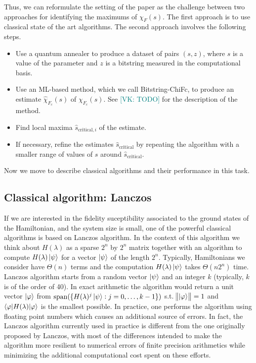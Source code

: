 \documentclass[american,aps,pra,reprint,floatfix,nofootinbib,superscriptaddress]{revtex4-2}
\DeclareMathOperator{\mspan}{span}
\newcommand{\VK}[1]{\textcolor{teal}{[VK: #1]}}
\begin{document}
Thus, we can reformulate the setting of the paper as the challenge
between two approaches for identifying the maximums of $\chi_F(s)$.
The first approach is to use classical state of the art algorithms.
The second approach involves the following steps.
\begin{itemize}
  \item Use a quantum annealer to produce a dataset of pairs $(s,z)$,
    where $s$ is a value of the parameter and $z$ is a bitstring
    measured in the computational basis.
  \item Use an ML-based method, which we call Bitstring-ChiFc,
    to produce an estimate
    $\widehat\chi_{F_c}(s)$ of $\chi_{F_c}(s)$.
    See \VK{TODO} for the description of the method.
  \item Find local maxima $\hat s_{\textrm{critical},i}$ of the estimate.
  \item If necessary, refine the estimates $\hat s_{\textrm{critical}}$
    by repeating the algorithm with a smaller range of values of $s$
    around $\hat s_{\textrm{critical}}$.
\end{itemize}

Now we move to describe classical algorithms and their performance in this
task.

\subsection{Classical algorithm: Lanczos}
If we are interested in the fidelity suceptibility associated
to the ground states of the Hamiltonian, and the system size is small,
one of the powerful classical algorithms is based on Lanczos algorithm.
In the context of this algorithm we think about $H(\lambda)$ as
a sparse $2^n$ by $2^n$ matrix together with an algorithm to compute
$H(\lambda)\ket{\psi}$ for a vector $\ket{\psi}$ of the length $2^n$.
Typically, Hamiltonians we consider have
$\Theta(n)$ terms and the computation $H(\lambda)\ket{\psi}$
takes $\Theta(n2^n)$ time. Lanczos algorithm starts from
a random vector $\ket{\psi}$ and an integer $k$ (typically,
$k$ is of the order of 40). In exact arithmetic the algorithm would
return a unit vector $\ket{\varphi}$ from
$\mspan(\{H(\lambda)^j\ket{\psi}: j=0,\dots,k-1\})$
s.t. $\norm{\ket{\varphi}} = 1$ and $\braket{\varphi|H(\lambda)|\varphi}$
is the smallest possible. In practice, one performs the algorithm
using floating point numbers which causes an additional source of errors.
In fact, the Lanczos algorithm currently used in practice is different
from the one originally proposed by Lanczos, with most of the differences
intended to make the algorithm more resilient to numerical errors of
finite precision arithmetics while minimizing the additional computational
cost spent on these efforts.
\end{document}
